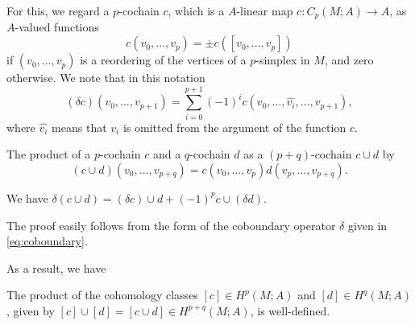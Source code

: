 \documentclass[12pt]{article}
\numberwithin{equation}{section}
\theoremstyle{remark}
\begin{document}
For this, we regard a  $p$-cochain $c$, which is a $A$-linear map $c:C_p(M;A)\to A$,
as $A$-valued functions \begin{equation}
c(v_0,\ldots,v_p) = \pm c([v_0,\ldots,v_p]) 
\end{equation}
if $(v_0,\ldots,v_p)$ is a reordering of the vertices of a $p$-simplex in $M$,
and zero otherwise.
We note that in this notation \begin{equation}
(\delta c)(v_0,\ldots,v_{p+1})= \sum_{i=0}^{p+1} (-1)^i c(v_0,\ldots,\widehat{v_i},\ldots,v_{p+1}),\label{eq:coboundary}
\end{equation} 
where $\widehat{v_i}$ means that $v_i$ is omitted from the argument of the function $c$.

\begin{definition}
The product of a $p$-cochain $c$ and a $q$-cochain $d$ as a $(p+q)$-cochain $c\cup d$ by \begin{equation}
(c\cup d)(v_0,\ldots,v_{p+q}) = c(v_0,\ldots,v_p) d(v_p,\ldots,v_{p+q}).
\end{equation}
\end{definition}

\begin{proposition}
We have $\delta(c\cup d) = (\delta c)\cup d + (-1)^p c\cup (\delta d)$.
\end{proposition}
The proof easily follows from the  form of the coboundary operator $\delta$ given in \eqref{eq:coboundary}.

As a result, we have
\begin{proposition}
The product of the cohomology classes $[c]\in H^p(M;A)$ and $[d]\in H^q(M;A)$,
given by $[c]\cup [d] = [c\cup d]\in H^{p+q}(M;A)$,
is well-defined.
\end{proposition}
\end{document}
